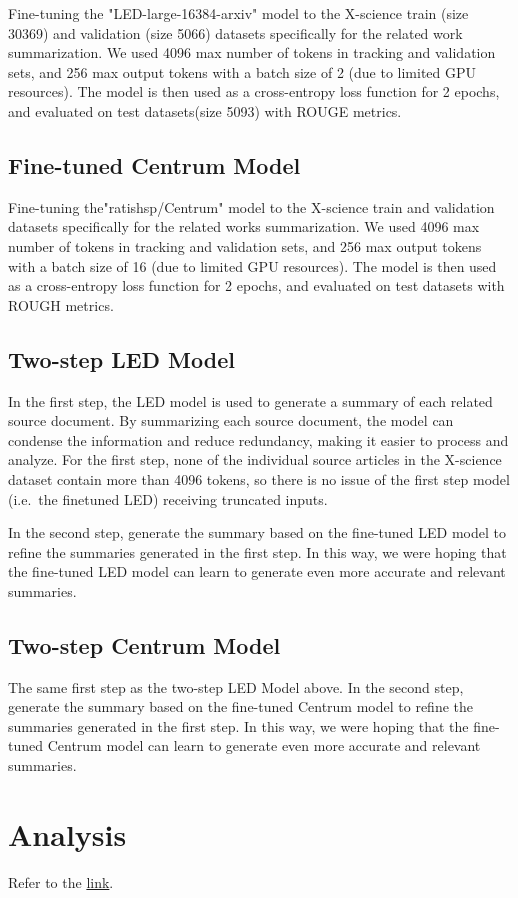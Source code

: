 \documentclass[12pt, twocolumn]{article}
\numberwithin{equation}{section}
\begin{document}
Fine-tuning the "LED-large-16384-arxiv" model to the X-science train (size 30369) and validation (size 5066) datasets specifically for the related work summarization. We used 4096 max number of tokens in tracking and validation sets, and 256 max output tokens with a batch size of 2 (due to limited GPU resources). The model is then used as a cross-entropy loss function for 2 epochs, and evaluated on test datasets(size 5093) with ROUGE metrics.

\subsection{Fine-tuned Centrum Model}
\label{app:model-ft-centrum}

Fine-tuning the"ratishsp/Centrum" model to the X-science train and validation datasets specifically for the related works summarization. We used 4096 max number of tokens in tracking and validation sets, and 256 max output tokens with a batch size of 16 (due to limited GPU resources). The model is then used as a cross-entropy loss function for 2 epochs, and evaluated on test datasets with ROUGH metrics.

\subsection{Two-step LED Model}
\label{app:model-two-step-led}

In the first step, the LED model is used to generate a summary of each related source document. By summarizing each source document, the model can condense the information and reduce redundancy, making it easier to process and analyze. For the first step, none of the individual source articles in the X-science dataset contain more than 4096 tokens, so there is no issue of the first step model (i.e.~the finetuned LED) receiving truncated inputs.

In the second step, generate the summary based on the fine-tuned LED model to refine the summaries generated in the first step. In this way, we were hoping that the fine-tuned LED model can learn to generate even more accurate and relevant summaries.

\subsection{Two-step Centrum Model}
\label{app:model-two-step-centrum}

The same first step as the two-step LED Model above. In the second step, generate the summary based on the fine-tuned Centrum model to refine the summaries generated in the first step. In this way, we were hoping that the fine-tuned Centrum model can learn to generate even more accurate and relevant summaries.

\section{Analysis}
\label{app:analysis}

Refer to the \href{https://drive.google.com/file/d/1sPLj4a-rafh1EjOR7l_QMveexfoaxq3y/view?usp=share_link}{link}.

{
    \footnotesize
    
    
}
\end{document}
